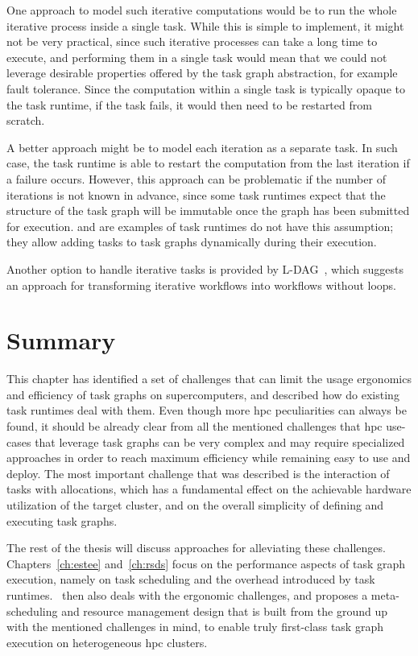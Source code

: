 \begin{description}[wide=0pt]
		One approach to model such iterative computations would be to run the whole iterative process
		inside a single task. While this is simple to implement, it might not be very practical, since such
		iterative processes can take a long time to execute, and performing them in a single task would
		mean that we could not leverage desirable properties offered by the task graph abstraction, for
		example fault tolerance. Since the computation within a single task is typically opaque to the task
		runtime, if the task fails, it would then need to be restarted from scratch.

		A better approach might be to model each iteration as a separate task. In such case, the task
		runtime is able to restart the computation from the last iteration if a failure occurs. However,
		this approach can be problematic if the number of iterations is not known in advance, since some
		task runtimes expect that the structure of the task graph will be immutable once the graph has been
		submitted for execution. \dask{} and \ray{} are examples of task
		runtimes do not have this assumption; they allow adding tasks to task graphs dynamically during
		their execution.

		Another option to handle iterative tasks is provided by
		\textsc{L-DAG}~\cite{l-dag}, which suggests an approach for transforming
		iterative workflows into workflows without loops.
\end{description}

\section*{Summary}
This chapter has identified a set of challenges that can limit the usage ergonomics and efficiency
of task graphs on supercomputers, and described how do existing task runtimes deal with them. Even
though more \gls{hpc} peculiarities can always be found, it should be already clear
from all the mentioned challenges that \gls{hpc} use-cases that leverage task graphs
can be very complex and may require specialized approaches in order to reach maximum efficiency
while remaining easy to use and deploy. The most important challenge that was described is the
interaction of tasks with allocations, which has a fundamental effect on the achievable hardware
utilization of the target cluster, and on the overall simplicity of defining and executing task
graphs.

The rest of the thesis will discuss approaches for alleviating these challenges.
Chapters~\ref{ch:estee} and~\ref{ch:rsds} focus on the performance aspects of
task graph execution, namely on task scheduling and the overhead introduced by task
runtimes.~ then also deals with the ergonomic challenges, and proposes a
meta-scheduling and resource management design that is built from the ground up with the mentioned
challenges in mind, to enable truly first-class task graph execution on heterogeneous
\gls{hpc} clusters.
